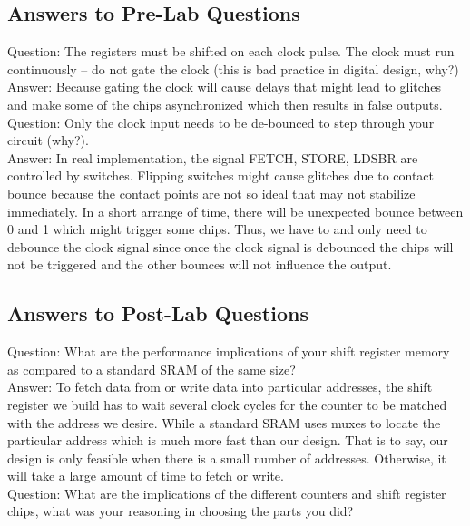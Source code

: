 \documentclass[12pt]{article}
\begin{document}
\subsection{\textbf{Answers to Pre-Lab Questions}}
Question: The registers must be shifted on each clock pulse. The clock must run continuously – do not gate the clock (this is bad practice in digital design, why?) \\

Answer: Because gating the clock will cause delays that might lead to glitches and make some of the chips asynchronized which then results in false outputs. \\

Question: Only the clock input needs to be de-bounced to step through your circuit (why?). \\

Answer: In real implementation, the signal FETCH, STORE, LDSBR are controlled by switches. Flipping switches might cause glitches due to contact bounce because the contact points are not so ideal that may not stabilize immediately. In a short arrange of time, there will be unexpected bounce between 0 and 1 which might trigger some chips. Thus, we have to and only need to debounce the clock signal since once the clock signal is debounced the chips will not be triggered and the other bounces will not influence the output.

\subsection{\textbf{Answers to Post-Lab Questions}}
Question: What are the performance implications of your shift register memory as compared to a standard SRAM of the same size? \\

Answer: To fetch data from or write data into particular addresses, the shift register we build has to wait several clock cycles for the counter to be matched with the address we desire. While a standard SRAM uses muxes to locate the particular address which is much more fast than our design. That is to say, our design is only feasible when there is a small number of addresses. Otherwise, it will take a large amount of time to fetch or write. \\

Question: What are the implications of the different counters and shift register chips, what was your reasoning in choosing the parts you did? \\
\end{document}
